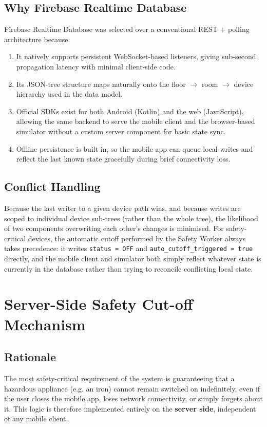 \documentclass[11pt,a4paper]{article}
\begin{document}
\subsection{Why Firebase Realtime Database}
Firebase Realtime Database was selected over a conventional REST + polling architecture because:
\begin{enumerate}
    \item It natively supports persistent WebSocket-based listeners, giving sub-second propagation latency with minimal client-side code.
    \item Its JSON-tree structure maps naturally onto the floor $\rightarrow$ room $\rightarrow$ device hierarchy used in the data model.
    \item Official SDKs exist for both Android (Kotlin) and the web (JavaScript), allowing the same backend to serve the mobile client and the browser-based simulator without a custom server component for basic state sync.
    \item Offline persistence is built in, so the mobile app can queue local writes and reflect the last known state gracefully during brief connectivity loss.
\end{enumerate}

\subsection{Conflict Handling}
Because the last writer to a given device path wins, and because writes are scoped to individual device sub-trees (rather than the whole tree), the likelihood of two components overwriting each other's changes is minimised. For safety-critical devices, the automatic cutoff performed by the Safety Worker always takes precedence: it writes \texttt{status = OFF} and \texttt{auto\_cutoff\_triggered = true} directly, and the mobile client and simulator both simply reflect whatever state is currently in the database rather than trying to reconcile conflicting local state.

\newpage
\section{Server-Side Safety Cut-off Mechanism}

\subsection{Rationale}
The most safety-critical requirement of the system is guaranteeing that a hazardous appliance (e.g. an iron) cannot remain switched on indefinitely, even if the user closes the mobile app, loses network connectivity, or simply forgets about it. This logic is therefore implemented entirely on the \textbf{server side}, independent of any mobile client.
\end{document}
